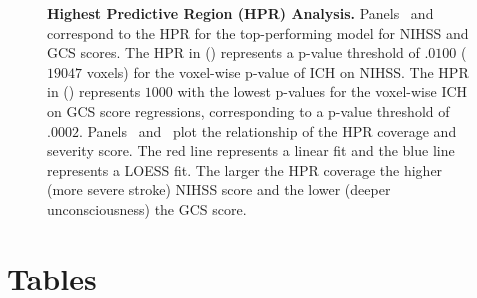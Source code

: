 \documentclass[10pt]{article}\usepackage[]{graphicx}\usepackage[]{color}
\begin{document}
\begin{figure}[H]
\centering
  \hfill
  \subfloat{
 \label{pvals:nihss}
 }
  \hfill
  \subfloat{
 \label{pvals:gcs}
 } 
 \newline
  \hfill
  \subfloat{
 \label{pvals:regnihss}
 }
  \hfill
  \subfloat{
 \label{pvals:reggcs}
 } 
 \newline 
  \caption{{\bf Highest Predictive Region (HPR) Analysis.}  Panels~\protect{} and~\protect{} correspond to the HPR for the top-performing model for NIHSS and GCS scores.  The HPR in (\protect{}) represents a p-value threshold of $.0100$ ($19047$ voxels) for the voxel-wise p-value of ICH on NIHSS. The HPR in (\protect{}) represents $1000$ with the lowest p-values for the voxel-wise ICH on GCS score regressions, corresponding to a p-value threshold of $.0002$.
    Panels~\protect{} and~\protect{} plot the relationship of the HPR coverage and severity score.  The red line represents a linear fit and the blue line represents a LOESS fit.  The larger the HPR coverage the higher (more severe stroke) NIHSS score and the lower (deeper unconsciousness) the GCS score.  
}
  \label{f:roi}
\end{figure}





\newpage

\section{Tables}












% 









% 










%





\clearpage
\newpage
\end{document}
